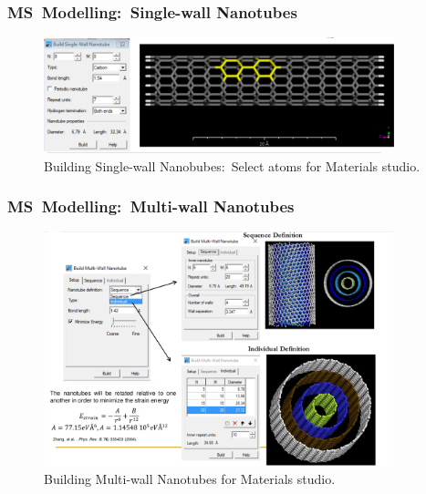 \frame
{
	\frametitle{\textrm{MS~Modelling:~Single-wall Nanotubes}}
\begin{figure}[h!]
\centering
\includegraphics[height=1.32in,width=4.00in,viewport=0 0 1302 429,clip]{Figures/MS-Building_Single_wall-nanotube-example.png}
\caption{\tiny \textrm{Building Single-wall Nanobubes:~Select atoms for Materials studio.}}%
\label{MS-Building_Single_wall-Nanotubes-example}
\end{figure}
}

\frame
{
	\frametitle{\textrm{MS~Modelling:~Multi-wall Nanotubes}}
\begin{figure}[h!]
\centering
\vspace*{-0.16in}
\includegraphics[height=2.68in,width=4.00in,viewport=0 0 1224 823,clip]{Figures/MS-Building_Multi_wall-nanotube.png}
\caption{\tiny \textrm{Building Multi-wall Nanotubes for Materials studio.}}%
\label{MS-Building_Multi_wall-Nanotubes}
\end{figure}
}


